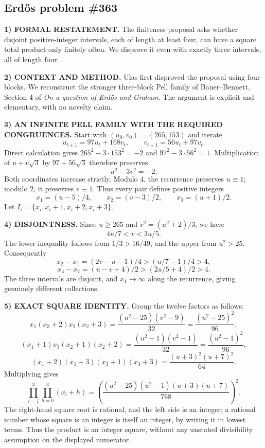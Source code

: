 \subsection*{Erd\H{o}s problem \#363}

\noindent\textbf{1) FORMAL RESTATEMENT.}
The finiteness proposal asks whether disjoint positive-integer intervals, each of length at least four, can have a square total product only finitely often. We disprove it even with exactly three intervals, all of length four.

\noindent\textbf{2) CONTEXT AND METHOD.}
Ulas first disproved the proposal using four blocks. We reconstruct the stronger three-block Pell family of Bauer--Bennett, Section 4 of \emph{On a question of Erd\H{o}s and Graham}. The argument is explicit and elementary, with no novelty claim.

\noindent\textbf{3) AN INFINITE PELL FAMILY WITH THE REQUIRED CONGRUENCES.}
Start with $(u_0,v_0)=(265,153)$ and iterate
\[
 u_{t+1}=97u_t+168v_t,\qquad
 v_{t+1}=56u_t+97v_t.
\]
Direct calculation gives $265^2-3\cdot153^2=-2$ and $97^2-3\cdot56^2=1$. Multiplication of $u+v\sqrt3$ by $97+56\sqrt3$ therefore preserves
\[
 u^2-3v^2=-2.
\]
Both coordinates increase strictly. Modulo $4$, the recurrence preserves $u\equiv1$; modulo $2$, it preserves $v\equiv1$. Thus every pair defines positive integers
\[
 x_1=(u-5)/4,\qquad x_2=(v-3)/2,\qquad x_3=(u+1)/2.
\]
Let $I_i=\{x_i,x_i+1,x_i+2,x_i+3\}$.

\noindent\textbf{4) DISJOINTNESS.}
Since $u\ge265$ and $v^2=(u^2+2)/3$, we have
\[
 4u/7<v<3u/5.
\]
The lower inequality follows from $1/3>16/49$, and the upper from $u^2>25$. Consequently
\[
 x_2-x_1=(2v-u-1)/4>(u/7-1)/4>4,
\]
\[
 x_3-x_2=(u-v+4)/2>(2u/5+4)/2>4.
\]
The three intervals are disjoint, and $x_1\to\infty$ along the recurrence, giving genuinely different collections.

\noindent\textbf{5) EXACT SQUARE IDENTITY.}
Group the twelve factors as follows:
\[
 x_1(x_3+2)x_2(x_2+3)
 =\frac{(u^2-25)(v^2-9)}{32}
 =\frac{(u^2-25)^2}{96},
\]
\[
 (x_1+1)x_3(x_2+1)(x_2+2)
 =\frac{(u^2-1)(v^2-1)}{32}
 =\frac{(u^2-1)^2}{96},
\]
\[
 (x_1+2)(x_1+3)(x_3+1)(x_3+3)
 =\frac{(u+3)^2(u+7)^2}{64}.
\]
Multiplying gives
\[
 \prod_{i=1}^3\prod_{h=0}^3(x_i+h)
 =\left(\frac{(u^2-25)(u^2-1)(u+3)(u+7)}{768}\right)^2.
\]
The right-hand square root is rational, and the left side is an integer; a rational number whose square is an integer is itself an integer, by writing it in lowest terms. Thus the product is an integer square, without any unstated divisibility assumption on the displayed numerator.

